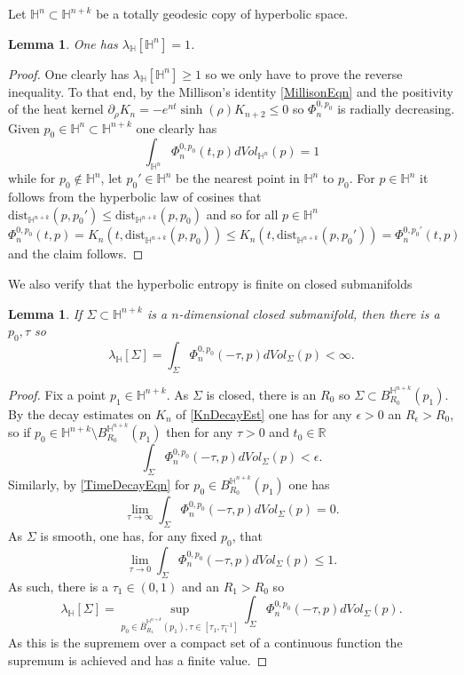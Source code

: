 \documentclass{amsart}
\newtheorem{lem}[thm]{Lemma}
\theoremstyle{definition}
\theoremstyle{remark}
\numberwithin{equation}{section}
\newcommand{\Real}{\mathbb R}
\newcommand{\dist}[0]{\mathrm{dist}}
\begin{document}
Let $\mathbb{H}^n\subset \mathbb{H}^{n+k}$ be a totally geodesic copy of hyperbolic space.
\begin{lem}
	\label{HyperplaneEntropyLem}
	One has $\lambda_{\mathbb{H}}[\mathbb{H}^n]=1$.
\end{lem}
\begin{proof}
	One clearly has $\lambda_{\mathbb{H}}[\mathbb{H}^n]\geq 1$ so we only have to prove the reverse inequality.  To that end, by the Millison's identity \eqref{MillisonEqn} and the positivity of the heat kernel $\partial_\rho K_n= -e^{nt} \sinh(\rho)K_{n+2} \leq 0$ so $\Phi_n^{0,p_0}$ is radially decreasing. 
	Given $p_0\in \mathbb{H}^n\subset \mathbb{H}^{n+k}$ one clearly has
	$$
	\int_{\mathbb{H}^n} \Phi_n^{0,p_0}(t,p) dVol_{\mathbb{H}^n}(p)=1
	$$
	while for $p_0\not \in \mathbb{H}^n$, let $p_0'\in \mathbb{H}^n$ be the nearest point in $\mathbb{H}^n$ to $p_0$.  For $p\in \mathbb{H}^n$ it follows from the hyperbolic law of cosines that $\dist_{\mathbb{H}^{n+k}}(p,p_0')\leq \dist_{\mathbb{H}^{n+k}}(p,p_0)$ and so for all $p\in \mathbb{H}^n$
	$$
	\Phi_n^{0, p_0}(t,p )=K_n(t, \dist_{\mathbb{H}^{n+k}}(p,p_0))\leq K_n(t, \dist_{\mathbb{H}^{n+k}}(p,p_0'))=\Phi_n^{0, p_0'}(t,p)
	$$
	and the claim follows.
\end{proof}
We also verify that the hyperbolic entropy is finite on closed submanifolds
\begin{lem}
	If $\Sigma\subset \mathbb{H}^{n+k}$ is a $n$-dimensional closed submanifold, then there is a $p_0, \tau$ so
	$$\lambda_{\mathbb{H}}[\Sigma]=\int_{\Sigma} \Phi_n^{0,p_0}(-\tau,p)dVol_\Sigma(p)<\infty.
	$$
\end{lem}
\begin{proof}
	Fix a point $p_1\in \mathbb{H}^{n+k}$.  As $\Sigma$ is closed, there is an $R_0$ so $\Sigma\subset B_{R_0}^{\mathbb{H}^{n+k}}(p_1)$.  
	By the decay estimates on $K_n$ of \ref{KnDecayEst} one has for any $\epsilon>0$ an $R_\epsilon>R_0$, so if $p_0\in  \mathbb{H}^{n+k}\setminus  B_{R_0}^{\mathbb{H}^{n+k}}(p_1)$ then for any $\tau>0$ and $t_0\in \Real$
	$$
	\int_{\Sigma} \Phi_{n}^{0,p_0} (-\tau,p) dVol_{\Sigma}(p)< \epsilon.
	$$
	Similarly, by \eqref{TimeDecayEqn} for $p_0\in  B_{R_0}^{\mathbb{H}^{n+k}}(p_1)$ one has
$$
\lim_{\tau\to \infty} 	\int_{\Sigma} \Phi_{n}^{0,p_0} (-\tau,p) dVol_{\Sigma}(p)=0.
$$
As $\Sigma$ is smooth, one has, for any fixed $p_0$, that
$$
\lim_{\tau\to 0} 	\int_{\Sigma} \Phi_{n}^{0,p_0} (-\tau,p) dVol_{\Sigma}(p)\leq 1.
$$
As such, there is a $\tau_1\in (0,1)$ and an $R_1>R_0$ so
$$
\lambda_{\mathbb{H}}[\Sigma]=\sup_{p_0\in  \bar{B}_{R_1}^{\mathbb{H}^{n+k}}(p_1), \tau\in [\tau_1, \tau_1^{-1}]} \int_{\Sigma} \Phi_{n}^{0,p_0} (-\tau,p) dVol_{\Sigma}(p).
$$
As this is the supremem over a compact set of a continuous function the supremum is achieved and has a finite value.
\end{proof}


\end{document}

